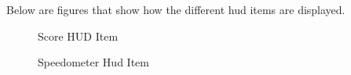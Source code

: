 \documentclass[11pt]{report}
\begin{document}




Below are figures that show how the different hud items are displayed.
\begin{figure}[H]
    \begin{minipage}{.5\textwidth}
        \centering
        \caption{Score HUD Item}
    \end{minipage}
    \begin{minipage}{.5\textwidth}
        \centering
        \caption{Speedometer Hud Item}
    \end{minipage}
\end{figure}
\end{document}
